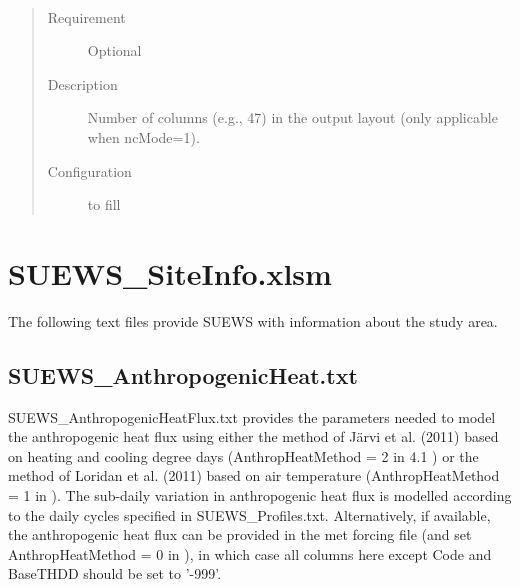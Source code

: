 \documentclass[letterpaper,10pt,english]{sphinxmanual}
\begin{document}

\begin{fulllineitems}
\label{\detokenize{input_files/RunControl/netCDF_related_options:cmdoption-arg-ncol}}~\begin{quote}\begin{description}
\item[{Requirement}] \leavevmode
Optional

\item[{Description}] \leavevmode
Number of columns (e.g., 47) in the output layout (only applicable when ncMode=1).

\item[{Configuration}] \leavevmode
to fill

\end{description}\end{quote}

\end{fulllineitems}



\section{SUEWS\_SiteInfo.xlsm}
\label{\detokenize{input_files/SUEWS_SiteInfo/SUEWS_SiteInfo::doc}}\label{\detokenize{input_files/SUEWS_SiteInfo/SUEWS_SiteInfo:suews-siteinfo-xlsm}}
The following text files provide SUEWS with information about the study
area.


\subsection{SUEWS\_AnthropogenicHeat.txt}
\label{\detokenize{input_files/SUEWS_SiteInfo/SUEWS_AnthropogenicHeat::doc}}\label{\detokenize{input_files/SUEWS_SiteInfo/SUEWS_AnthropogenicHeat:suews-anthropogenicheat-txt}}\label{\detokenize{input_files/SUEWS_SiteInfo/SUEWS_AnthropogenicHeat:id1}}
SUEWS\_AnthropogenicHeatFlux.txt provides the parameters needed to model
the anthropogenic heat flux using either the method of Järvi et al.
(2011) based on heating and cooling degree days (AnthropHeatMethod = 2
in 4.1 {\hyperref[\detokenize{input_files/RunControl/RunControl:runcontrol-nml}]{}}) or the method of Loridan et
al. (2011) based on air temperature (AnthropHeatMethod = 1 in
{\hyperref[\detokenize{input_files/RunControl/RunControl:runcontrol-nml}]{}}). The sub-daily variation in
anthropogenic heat flux is modelled according to the daily cycles
specified in SUEWS\_Profiles.txt. Alternatively, if available, the
anthropogenic heat flux can be provided in the met forcing file (and set
AnthropHeatMethod = 0 in {\hyperref[\detokenize{input_files/RunControl/RunControl:runcontrol-nml}]{}}), in which
case all columns here except Code and BaseTHDD should be set to ’-999’.
\end{document}
